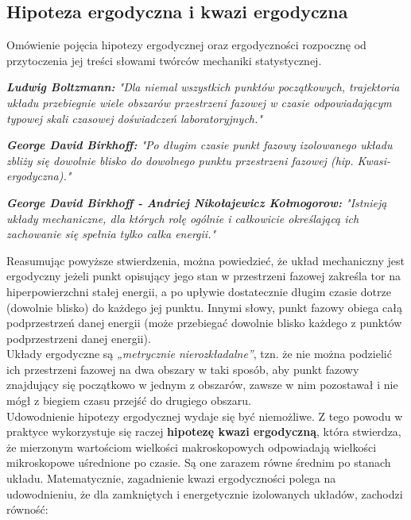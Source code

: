 \documentclass[12pt,a4paper,openright]{report} %
\begin{document}
\subsection{Hipoteza ergodyczna i kwazi ergodyczna}  
Omówienie pojęcia hipotezy ergodycznej oraz ergodyczności rozpocznę od przytoczenia jej treści słowami twórców mechaniki statystycznej.\\
\begin{center}
\textit{\textbf{Ludwig Boltzmann:} "Dla niemal wszystkich punktów początkowych, trajektoria układu przebiegnie wiele obszarów przestrzeni fazowej w czasie odpowiadającym typowej skali czasowej doświadczeń laboratoryjnych."}\\
\end{center}
\begin{center}
\textit{\textbf{George David Birkhoff:} "Po długim czasie punkt fazowy izolowanego układu zbliży się dowolnie blisko do dowolnego punktu przestrzeni fazowej (hip. Kwasi-ergodyczna)."}\\
\end{center}
\begin{center}
\textit{\textbf{George David Birkhoff - Andriej Nikołajewicz Kołmogorow:} "Istnieją układy mechaniczne, dla których rolę ogólnie i całkowicie określającą ich zachowanie się spełnia tylko całka energii."}\\
\end{center}
Reasumując powyższe stwierdzenia, można powiedzieć, że układ mechaniczny jest ergodyczny jeżeli punkt opisujący jego stan w przestrzeni fazowej zakreśla tor na hiperpowierzchni stałej energii, a po upływie dostatecznie długim czasie dotrze (dowolnie blisko) do każdego jej punktu. Innymi słowy, punkt fazowy obiega całą podprzestrzeń danej energii (może przebiegać dowolnie blisko każdego z punktów podprzestrzeni danej energii).\\
Układy ergodyczne są \textit{„metrycznie nierozkładalne”}, tzn. że nie można podzielić ich przestrzeni fazowej na dwa obszary w taki sposób, aby punkt fazowy znajdujący się początkowo w jednym z obszarów, zawsze w nim pozostawał i nie mógł z biegiem czasu przejść do drugiego obszaru.\\  
Udowodnienie hipotezy ergodycznej wydaje się być niemożliwe. Z tego powodu w praktyce wykorzystuje się raczej \textbf{hipotezę kwazi ergodyczną}, która stwierdza, że mierzonym wartościom wielkości makroskopowych odpowiadają wielkości mikroskopowe uśrednione po czasie. Są one zarazem równe średnim po stanach układu.
Matematycznie, zagadnienie kwazi ergodyczności polega na udowodnieniu, że dla zamkniętych i energetycznie izolowanych układów, zachodzi równość:
\end{document}
